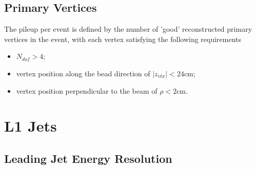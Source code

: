 \section{Primary Vertices}

\label{app:primaryvertices}

The pileup per event is defined by the number of 'good' reconstructed primary vertices in the event, with each vertex satisfying the following requirements

\begin{itemize}
	\item $N_{dof} > 4$;
	\item vertex position along the bead direction of $\vert z_{vtx} \vert < 24$cm; 
	\item vertex position perpendicular to the beam of $\rho < 2$cm.

\end{itemize}


\chapter{L1 Jets}

\section{Leading Jet Energy Resolution}
\label{app:jetpuresolution}

\begin{figure}[htp]

    \centering
    \,
\end{figure}

